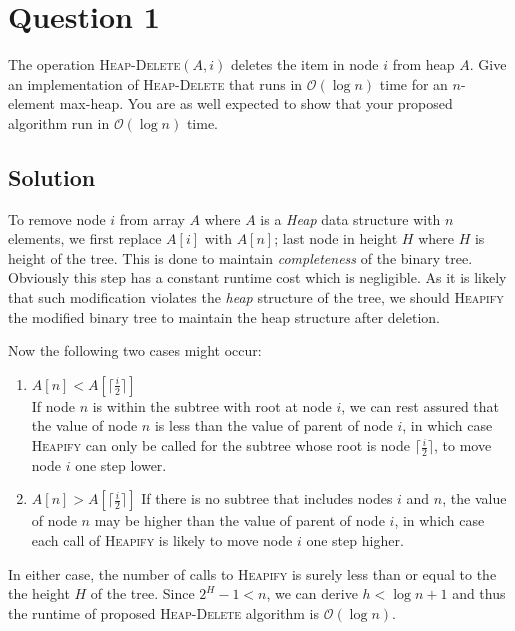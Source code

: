 
\section*{Question 1}

The operation \textsc{Heap-Delete}$(A,i)$ deletes the item in node $i$ from heap $A$.
Give an implementation of \textsc{Heap-Delete} that runs in $\mathcal{O}(\log n)$ time for an $n$-element max-heap.
You are as well expected to show that your proposed algorithm run in $\mathcal{O}(\log n)$ time.

\subsection*{Solution}

To remove node $i$ from array $A$ where $A$ is a \textit{Heap} data structure with $n$ elements, we first replace $A[i]$ with $A[n]$; last node in height $H$ where $H$ is height of the tree.
This is done to maintain \textit{completeness} of the binary tree.
Obviously this step has a constant runtime cost which is negligible.
As it is likely that such modification violates the \textit{heap} structure of the tree, we should \textsc{Heapify} the modified binary tree to maintain the heap structure after deletion.

Now the following two cases might occur:

\begin{enumerate}[label=(\alph*)]
\item $A[n] < A[\lceil \frac{i}{2} \rceil ] $\\
If node $n$ is within the subtree with root at node $i$, we can rest assured that the value of node $n$ is less than the value of parent of node $i$, in which case \textsc{Heapify} can only be called for the subtree whose root is node $\lceil \frac{i}{2} \rceil$, to move node $i$ one step lower.

\item $A[n] > A[\lceil \frac{i}{2} \rceil ] $
If there is no subtree that includes nodes $i$ and $n$, the value of node $n$ may be higher than the value of parent of node $i$, in which case each call of \textsc{Heapify} is likely to move node $i$ one step higher.
\end{enumerate}

In either case, the number of calls to \textsc{Heapify} is surely less than or equal to the the height $H$ of the tree.
Since $ 2^{H} - 1 < n $, we can derive $ h < \log {n+1} $ and thus the runtime of proposed \textsc{Heap-Delete} algorithm is $\mathcal{O}(\log n)$.
